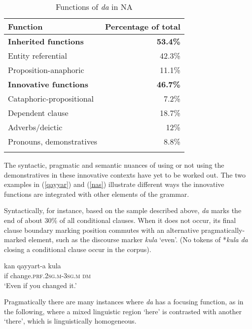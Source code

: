 \documentclass[output=paper]{langsci/langscibook}
\begin{document}
\begin{table}\begin{tabularx}{.67\textwidth}{lr}
\lsptoprule
Function & Percentage of total\\
\midrule
\bfseries Inherited functions & \bfseries 53.4\%\\
        \hspace{5mm}Entity referential  & 42.3\%\\
        \hspace{5mm}Proposition-anaphoric  & 11.1\%\\
\addlinespace        
\bfseries Innovative functions & \bfseries 46.7\%\\
        \hspace{5mm}Cataphoric-propositional & 7.2\%\\
        \hspace{5mm}Dependent clause & 18.7\%\\
        \hspace{5mm}Adverbs/deictic & 12\%\\
        \hspace{5mm}Pronouns, demonstratives & 8.8\%\\
\lspbottomrule
\end{tabularx}
\caption{
\label{bkm:Ref520915528}\label{tab:nigeria:}Functions of \textit{da} in NA
}
\label{tab:funct}
\end{table}


The syntactic, pragmatic and semantic nuances of using or not using the dem\-onstratives in these innovative contexts have yet to be worked out. The two examples in (\ref{qayyar}) and (\ref{nas}) illustrate different ways the innovative functions are integrated with other elements of the grammar.

Syntactically, for instance, based on the sample described above, \textit{da} marks the end of about 30\% of all conditional clauses. When it does not occur, its final clause boundary marking position commutes with an alternative pragmatically-marked element, such as the discourse marker \textit{kula} ‘even’. (No tokens of *\textit{kula} \textit{da} closing a conditional clause occur in the corpus).

\ea\label{qayyar} 
\gll kan qayyart-a kula\\
     if change.\textsc{prf.2sg.m-3sg.m} \textsc{dm}\\
\glt ‘Even if you changed it.’
\z

Pragmatically there are many instances where \textit{da} has a focusing function, as in the following, where a mixed linguistic region ‘here’ is contrasted with another ‘there’, which is linguistically homogeneous.
\end{document}
